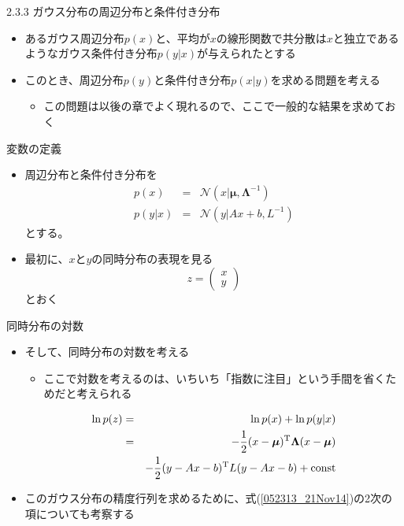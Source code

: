 \begin{frame}{2.3.3 ガウス分布の周辺分布と条件付き分布}
 \begin{itemize}
  \item あるガウス周辺分布$p(x)$と、平均が$x$の線形関数で共分散は$x$と独立であるようなガウス条件付き分布$p(y|x)$が与えられたとする
  \item このとき、周辺分布$p(y)$と条件付き分布$p(x|y)$を求める問題を考える
        \begin{itemize}
         \item この問題は以後の章でよく現れるので、ここで一般的な結果を求めておく
        \end{itemize}
 \end{itemize}
\end{frame}

\begin{frame}{変数の定義}
 \begin{itemize}
  \item 周辺分布と条件付き分布を
        \begin{eqnarray}
         p(x) &=& \mathcal{N}(x|\bm{\mu} , \bm{\Lambda}^{-1})\\
         p(y|x) &=& \mathcal{N}(y|Ax+b, L^{-1})
        \end{eqnarray}
        とする。
  \item 最初に、$x$と$y$の同時分布の表現を見る
        \begin{equation}
         z = \begin{pmatrix}
              x \\
              y
             \end{pmatrix}
        \end{equation}
        とおく
 \end{itemize}
\end{frame}

\begin{frame}{同時分布の対数}
 \begin{itemize}
  \item そして、同時分布の対数を考える
  \begin{itemize}
   \item ここで対数を考えるのは、いちいち「指数に注目」という手間を省くためだと考えられる
  \end{itemize}
        \begin{eqnarray}
         \ln p(z) &=& \ln p(x) + \ln p(y|x) \nonumber \\
         &= & -\frac{1}{2}(x-\bm{\mu})^{\mathrm{T}}\bm{\Lambda}(x-\bm{\mu}) \nonumber \\
         &&-\frac{1}{2}(y-Ax-b)^{\mathrm{T}}L(y-Ax-b)+{\rm const}\label{052313_21Nov14}
        \end{eqnarray}
  \item このガウス分布の精度行列を求めるために、式(\ref{052313_21Nov14})の2次の項についても考察する
 \end{itemize}
\end{frame}

